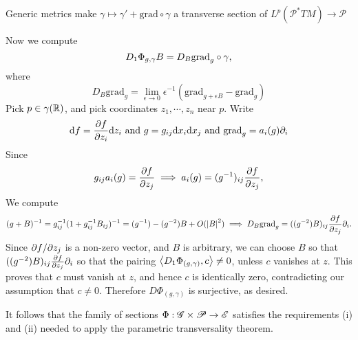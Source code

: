\documentclass{amsart}
\begin{document}
\begin{clear}{Generic metrics make $\gamma\mapsto
    \gamma'+\text{grad}\circ \gamma$ a transverse section of
    $L^{p}(\mathscr{P}^{*}TM)\to \mathscr{P}$}
\begin{example}
    Now we compute
    \begin{equation*}
      D_{1}\Phi_{g,\gamma}B=D_{B}\mathrm{grad}_{g}\circ \gamma,
    \end{equation*}
    where
    \begin{equation*}
      D_{B}\text{grad}_{g}=\lim_{\epsilon\to 0}\epsilon^{-1}(\text{grad}_{g+\epsilon B}-\text{grad}_{g})
    \end{equation*}
    Pick $p\in \gamma(\mathbb{R})$, and pick coordinates $z_{1},\cdots,z_{n}$
    near $p$. Write
    \begin{equation*}
      \mathrm{d} f=\frac{\partial f}{\partial z_{i}}\mathrm{d} z_{i}\text{ and }g=g_{ij}\mathrm{d} x_{i}\mathrm{d}
      x_{j}\text{ and }\mathrm{grad}_{g}=a_{i}(g)\partial_{i}
    \end{equation*}
    Since
    \begin{equation*}
      g_{ij}a_{i}(g)=\frac{\partial f}{\partial z_{j}}\implies a_{i}(g)=(g^{-1})_{ij}\frac{\partial f}{\partial z_{j}},
    \end{equation*}
    We compute
    \begin{equation*}
      (g+B)^{-1}=g_{ij}^{-1}(1+g_{ij}^{-1}B_{ij})^{-1}=(g^{-1})-(g^{-2})B+O(\left|B\right|^{2})\implies
      D_{B}\text{grad}_{g}=((g^{-2})B)_{ij}\frac{\partial f}{\partial z_{j}}\partial_{i}.
    \end{equation*}
    Since $\partial f/\partial z_{j}$ is a non-zero vector, and $B$ is
    arbitrary, we can choose $B$ so that
    $((g^{-2})B)_{ij}\frac{\partial f}{\partial z_{j}}\partial_{i}$ so that the pairing
    $\left\langle D_{1}\Phi_{(g,\gamma)},c\right\rangle\ne 0$, unless $c$ vanishes at
    $z$. This proves that $c$ must vanish at $z$, and hence $c$ is
    identically zero, contradicting our assumption that $c\ne
    0$. Therefore $D\Phi_{(g,\gamma)}$ is surjective, as desired.

    It follows that the family of sections $\Phi:\mathscr{G}\times
    \mathscr{P}\to \mathscr{E}$ satisfies the requirements (i) and    (ii) needed to apply the parametric transversality theorem.
  \end{example}
\end{clear}


\end{document}
